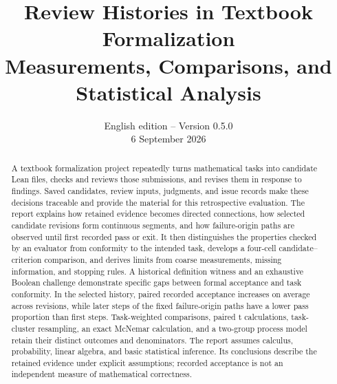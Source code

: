 
\title{Review Histories in Textbook Formalization\\[0.6em]\large Measurements, Comparisons, and Statistical Analysis}
\author{}
\date{English edition -- Version 0.5.0\\6 September 2026}

\maketitle
\begin{abstract}
A textbook formalization project repeatedly turns mathematical tasks into candidate Lean files, checks and reviews those submissions, and revises them in response to findings. Saved candidates, review inputs, judgments, and issue records make these decisions traceable and provide the material for this retrospective evaluation. The report explains how retained evidence becomes directed connections, how selected candidate revisions form continuous segments, and how failure-origin paths are observed until first recorded pass or exit. It then distinguishes the properties checked by an evaluator from conformity to the intended task, develops a four-cell candidate--criterion comparison, and derives limits from coarse measurements, missing information, and stopping rules. A historical definition witness and an exhaustive Boolean challenge demonstrate specific gaps between formal acceptance and task conformity. In the selected history, paired recorded acceptance increases on average across revisions, while later steps of the fixed failure-origin paths have a lower pass proportion than first steps. Task-weighted comparisons, paired t calculations, task-cluster resampling, an exact McNemar calculation, and a two-group process model retain their distinct outcomes and denominators. The report assumes calculus, probability, linear algebra, and basic statistical inference. Its conclusions describe the retained evidence under explicit assumptions; recorded acceptance is not an independent measure of mathematical correctness.
\end{abstract}
\clearpage
\begingroup
\small
\setlength{\parskip}{0pt}
\renewcommand{\baselinestretch}{1.0}\selectfont
\tableofcontents
\endgroup
\clearpage









\clearpage
\appendix

\clearpage

\begingroup
\small
{}

\endgroup

